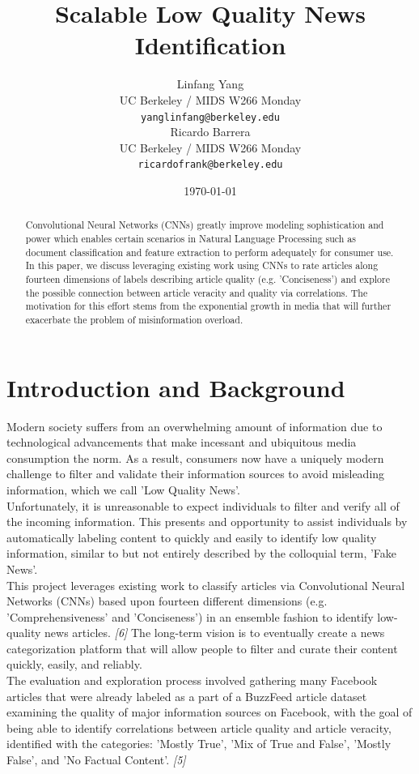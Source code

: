\documentclass[11pt]{article}
\title{Scalable Low Quality News Identification}
\author{Linfang Yang \\
  UC Berkeley / MIDS W266 Monday\\
  {\tt yanglinfang@berkeley.edu} \\\And
  Ricardo Barrera \\
  UC Berkeley / MIDS W266 Monday \\
  {\tt ricardofrank@berkeley.edu} \\}
\date{\today}
\begin{document}
\maketitle
\begin{abstract}
Convolutional Neural Networks (CNNs) greatly improve modeling sophistication and power which enables certain scenarios in Natural Language Processing such as document classification and feature extraction to perform adequately for consumer use.  In this paper, we discuss leveraging existing work using CNNs to rate articles along fourteen dimensions of labels describing article quality (e.g. 'Conciseness') and explore the possible connection between article veracity and quality via correlations.  The motivation for this effort stems from the exponential growth in media that will further exacerbate the problem of misinformation overload.
\end{abstract}

\section{Introduction and Background}

\indent \indent Modern society suffers from an overwhelming amount of information due to technological advancements that make incessant and ubiquitous media consumption the norm.  As a result, consumers now have a uniquely modern challenge to filter and validate their information sources to avoid misleading information, which we call 'Low Quality News'.  \\
\indent Unfortunately, it is unreasonable to expect individuals to filter and verify all of the incoming information.  This presents and opportunity to assist individuals by automatically labeling content to quickly and easily to identify low quality information, similar to but not entirely described by the colloquial term, 'Fake News'. \\
\indent This project leverages existing work to classify articles via Convolutional Neural Networks (CNNs) based upon fourteen different dimensions (e.g. 'Comprehensiveness' and 'Conciseness') in an ensemble fashion to identify low-quality news articles. \textit{[6]} The long-term vision is to eventually create a news categorization platform that will allow people to filter and curate their content quickly, easily, and reliably. \\
\indent The evaluation and exploration process involved gathering many Facebook articles that were already labeled as a part of a BuzzFeed article dataset examining the quality of major information sources on Facebook, with the goal of being able to identify correlations between article quality and article veracity, identified with the categories: 'Mostly True', 'Mix of True and False', 'Mostly False', and 'No Factual Content'. \textit{[5]}  
\end{document}
